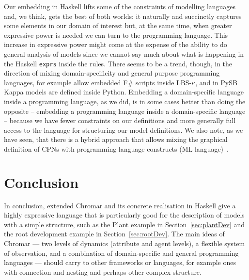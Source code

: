 Our embedding in Haskell lifts some of the constraints of modelling languages
and, we think, gets the best of both worlds: it naturally and succinctly
captures some elements in our domain of interest but, at the same time, when
greater expressive power is needed we can turn to the programming language. This
increase in expressive power might come at the expense of the ability to do
general analysis of models since we cannot say much about what is happening in
the Haskell \texttt{exprs} inside the rules. There seems to be a trend, though,
in the direction of mixing domain-specificity and general purpose programming
languages, for example \citet{pedersen_high-level_2015} allow embedded F\#
scripts inside LBS-$\kappa$, and in PySB \citep{lopez_programming_2013} Kappa
models are defined inside Python. Embedding a domain-specific language inside a
programming language, as we did, is in some cases better than doing the opposite
-- embedding a programming language inside a domain-specific language -- because
we have fewer constraints on our definitions and more generally full access to
the language for structuring our model definitions. We also note, as we have
seen, that there is a hybrid approach that allows mixing the graphical
definition of CPNs with programming language constructs (ML
language)~\citep{jensen_coloured_1987}.

\section{Conclusion}
In conclusion, extended Chromar and its concrete realisation in Haskell give a
highly expressive language that is particularly good for the description of
models with a simple structure, such as the Plant example in
Section~\ref{sec:plantDev} and the root development example in
Section~\ref{sec:rootDev}. The main ideas of Chromar --- two levels of dynamics
(attribute and agent levels), a flexible system of observation, and a
combination of domain-specific and general programming languages --- should
carry to other frameworks or languages, for example ones with connection and
nesting and perhaps other complex structure.

